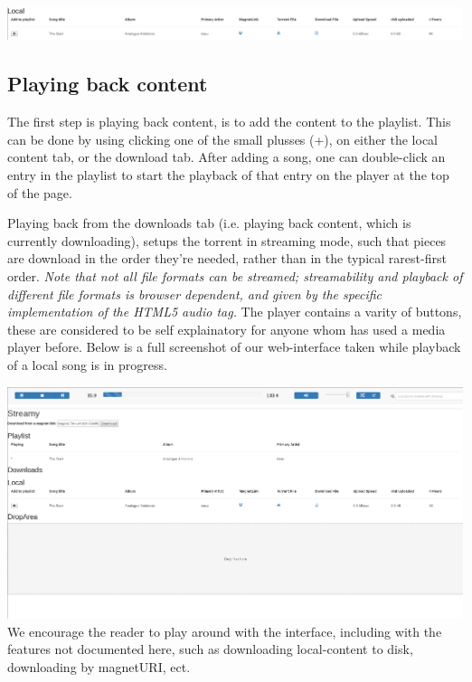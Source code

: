 \includegraphics[width=\linewidth]{gfx/local-info}

\subsection{Playing back content}
The first step is playing back content, is to add the content to the playlist.
This can be done by using clicking one of the small plusses (+), on either the
local content tab, or the download tab.
\newline
After adding a song, one can double-click an entry in the playlist to start the
playback of that entry on the player at the top of the page.

Playing back from the downloads tab (i.e. playing back content, which is
currently downloading), setups the torrent in streaming mode, such that pieces
are download in the order they're needed, rather than in the typical
rarest-first order.
{\em Note that not all file formats can be streamed; streamability and playback
of different file formats is browser dependent, and given by the specific
implementation of the HTML5 audio tag.}
\newline\newline
The player contains a varity of buttons, these are considered to be self
explainatory for anyone whom has used a media player before. Below is a full
screenshot of our web-interface taken while playback of a local song is in
progress.

\includegraphics[width=\linewidth]{gfx/interface}
\newline
We encourage the reader to play around with the interface, including with the
features not documented here, such as downloading local-content to disk,
downloading by magnetURI, ect.
